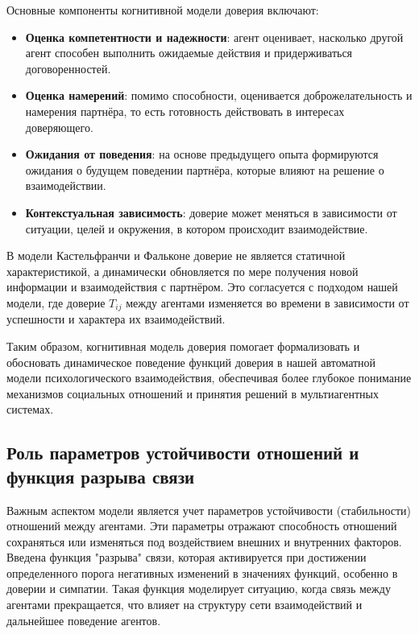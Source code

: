 \documentclass[12pt]{article}
\begin{document}
Основные компоненты когнитивной модели доверия включают:

\begin{itemize}
    \item \textbf{Оценка компетентности и надежности}: агент оценивает, насколько другой агент способен выполнить ожидаемые действия и придерживаться договоренностей.
    \item \textbf{Оценка намерений}: помимо способности, оценивается доброжелательность и намерения партнёра, то есть готовность действовать в интересах доверяющего.
    \item \textbf{Ожидания от поведения}: на основе предыдущего опыта формируются ожидания о будущем поведении партнёра, которые влияют на решение о взаимодействии.
    \item \textbf{Контекстуальная зависимость}: доверие может меняться в зависимости от ситуации, целей и окружения, в котором происходит взаимодействие.
\end{itemize}

В модели Кастельфранчи и Фальконе доверие не является статичной характеристикой, а динамически обновляется по мере получения новой информации и взаимодействия с партнёром. Это согласуется с подходом нашей модели, где доверие \( T_{ij} \) между агентами изменяется во времени в зависимости от успешности и характера их взаимодействий.

Таким образом, когнитивная модель доверия помогает формализовать и обосновать динамическое поведение функций доверия в нашей автоматной модели психологического взаимодействия, обеспечивая более глубокое понимание механизмов социальных отношений и принятия решений в мультиагентных системах.



\subsection*{Роль параметров устойчивости отношений и функция разрыва связи}

Важным аспектом модели является учет параметров устойчивости (стабильности) отношений между агентами. Эти параметры отражают способность отношений сохраняться или изменяться под воздействием внешних и внутренних факторов. Введена функция "разрыва" связи, которая активируется при достижении определенного порога негативных изменений в значениях функций, особенно в доверии и симпатии. Такая функция моделирует ситуацию, когда связь между агентами прекращается, что влияет на структуру сети взаимодействий и дальнейшее поведение агентов.
\end{document}
